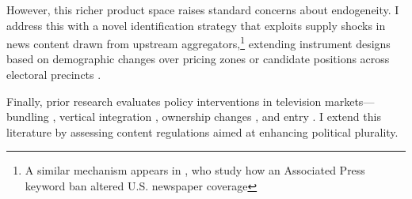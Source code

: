 \documentclass[12pt]{article}
\begin{document}
However, this richer product space raises standard concerns about endogeneity. I address this with a novel identification strategy that exploits supply shocks in news content drawn from upstream aggregators,\footnote{ A similar mechanism appears in \citet{milena}, who study how an Associated Press keyword ban altered U.S. newspaper coverage} extending instrument designs based on demographic changes over pricing zones \citep{fan,gentzkow2010media} or candidate positions across electoral precincts \citep{longuet-marx2025party}.


Finally, prior research evaluates policy interventions in television markets—bundling \citep{crawford_yurukoglu}, vertical integration \citep{crawford_vertical}, ownership changes \citep{MARTIN_McCRAIN_2019,CageHengelHerveUrvoy2022}, and entry \citep{prat_stromberg_entry}. I extend this literature by assessing content regulations aimed at enhancing political plurality.
\end{document}
